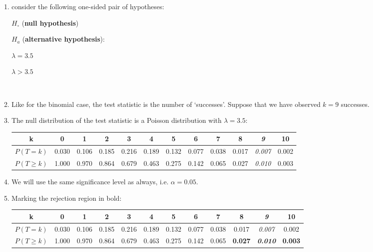 \begin{enumerate}
\item consider the following one-sided pair of hypotheses:

  \noindent\begin{minipage}{.4\textwidth}
    $H_\circ$ (\textbf{null hypothesis})
    
    \vspace{1em}
    
    $H_a$ (\textbf{alternative hypothesis}):
  \end{minipage}
  \begin{minipage}{.2\textwidth}
  \end{minipage}
  \begin{minipage}{.2\textwidth}
    $\lambda = 3.5$
    
    \vspace{1em}
    
    $\lambda>{3.5}$
  \end{minipage}
  \begin{minipage}{.2\textwidth}
  \end{minipage}\\

\item Like for the binomial case, the test statistic is the number of
  `successes'.  Suppose that we have observed $k=9$ successes.

\item The null distribution of the test statistic is a Poisson
  distribution with $\lambda={3.5}$:
  
  \begin{tabular}{c@{~}c@{~}c@{~}c@{~}c@{~}c@{~}c@{~}c@{~}c@{~}c@{~}c@{~}c}
    k & 0 & 1 & 2 & 3 & 4 & 5 & 6 & 7 & 8 & \textit{9} & 10 \\ \hline
    $P(T=k)$ & 0.030 & 0.106 & 0.185 & 0.216 & 0.189 &
    0.132 & 0.077 & 0.038 & 0.017 & \textit{0.007} & 0.002 \\
    $P({T}\geq{k})$ & 1.000 & 0.970 & 0.864 & 0.679 & 0.463 &
    0.275 & 0.142 & 0.065 & 0.027 & \textit{0.010} & 0.003 \\
  \end{tabular}

\item We will use the same significance level as always,
  i.e. $\alpha=0.05$.

\item Marking the rejection region in bold:

  \begin{tabular}{c@{~}c@{~}c@{~}c@{~}c@{~}c@{~}c@{~}c@{~}c@{~}c@{~}c@{~}c}
    k & 0 & 1 & 2 & 3 & 4 & 5 & 6 & 7 & \textbf{8} &
    \textbf{\textit{9}} & \textbf{10} \\ \hline
    $P(T=k)$ & 0.030 & 0.106 & 0.185 & 0.216 & 0.189 &
    0.132 & 0.077 & 0.038 & 0.017 & \textit{0.007} & 0.002 \\
    $P({T}\geq{k})$ & 1.000 & 0.970 & 0.864 & 0.679 & 0.463 &
    0.275 & 0.142 & 0.065 & \textbf{0.027} & \textbf{\textit{0.010}} &
    \textbf{0.003} \\
  \end{tabular}


\end{enumerate}
